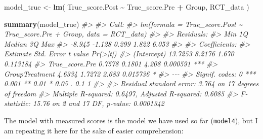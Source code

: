\documentclass[
]{book}
\newenvironment{Shaded}{\begin{snugshade}}{\end{snugshade}}
\newcommand{\CommentTok}[1]{\textcolor[rgb]{0.56,0.35,0.01}{\textit{#1}}}
\newcommand{\KeywordTok}[1]{\textcolor[rgb]{0.13,0.29,0.53}{\textbf{#1}}}
\newcommand{\NormalTok}[1]{#1}
\newcommand{\OperatorTok}[1]{\textcolor[rgb]{0.81,0.36,0.00}{\textbf{#1}}}
\newcommand{\StringTok}[1]{\textcolor[rgb]{0.31,0.60,0.02}{#1}}
\begin{document}
\begin{Shaded}
\begin{Highlighting}[]
\NormalTok{model\_true <{-}}\StringTok{ }\KeywordTok{lm}\NormalTok{(}
\NormalTok{  True\_score.Post }\OperatorTok{\textasciitilde{}}\StringTok{ }\NormalTok{True\_score.Pre }\OperatorTok{+}\StringTok{ }\NormalTok{Group,}
\NormalTok{  RCT\_data}
\NormalTok{)}

\KeywordTok{summary}\NormalTok{(model\_true)}
\CommentTok{\#> }
\CommentTok{\#> Call:}
\CommentTok{\#> lm(formula = True\_score.Post \textasciitilde{} True\_score.Pre + Group, data = RCT\_data)}
\CommentTok{\#> }
\CommentTok{\#> Residuals:}
\CommentTok{\#>    Min     1Q Median     3Q    Max }
\CommentTok{\#> {-}8.945 {-}1.128  0.299  1.822  6.053 }
\CommentTok{\#> }
\CommentTok{\#> Coefficients:}
\CommentTok{\#>                Estimate Std. Error t value Pr(>|t|)    }
\CommentTok{\#> (Intercept)     13.7253     8.2176   1.670 0.113184    }
\CommentTok{\#> True\_score.Pre   0.7578     0.1801   4.208 0.000591 ***}
\CommentTok{\#> GroupTreatment   4.6334     1.7272   2.683 0.015736 *  }
\CommentTok{\#> {-}{-}{-}}
\CommentTok{\#> Signif. codes:  0 \textquotesingle{}***\textquotesingle{} 0.001 \textquotesingle{}**\textquotesingle{} 0.01 \textquotesingle{}*\textquotesingle{} 0.05 \textquotesingle{}.\textquotesingle{} 0.1 \textquotesingle{} \textquotesingle{} 1}
\CommentTok{\#> }
\CommentTok{\#> Residual standard error: 3.764 on 17 degrees of freedom}
\CommentTok{\#> Multiple R{-}squared:  0.6497,	Adjusted R{-}squared:  0.6085 }
\CommentTok{\#> F{-}statistic: 15.76 on 2 and 17 DF,  p{-}value: 0.0001342}
\end{Highlighting}
\end{Shaded}

The model with measured scores is the model we have used so far (\texttt{model4}), but I am repeating it here for the sake of easier comprehension:
\end{document}
